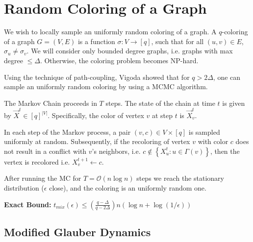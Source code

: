 \section{Random Coloring of a Graph}%
\label{sec:random_coloring_of_a_graph}

We wish to locally sample an uniformly random coloring of a graph.
A $q$-coloring of a graph $G = (V, E)$ is a function $\sigma : V\rightarrow [q]$,
such that for all $(u,v)\in E$, $\sigma_u \not= \sigma_v$.
We will consider only bounded degree graphs, i.e. graphs with max degree $\le \Delta$.
Otherwise, the coloring problem becomes NP-hard.

Using the technique of path-coupling, Vigoda  showed that for $q > 2\Delta$,
one can sample an uniformly random coloring by using a MCMC algorithm.

The Markov Chain proceeds in $T$ steps. The state of the chain at time $t$ is given by $\vec X^t\in [q]^{|V|}$.
Specifically, the color of vertex $v$ at step $t$ is $\vec X^t_v$.

In each step of the Markov process, a pair $(v, c)\in V\times [q]$ is sampled uniformly at random.
Subsequently, if the recoloring of vertex $v$ with color $c$ does not result in a conflict with $v$'s neighbors,
i.e. $c\not\in \left\{ X^t_u : u\in \Gamma(v)\right\}$, then the vertex is recolored i.e. $X_v^{t+1}\leftarrow c$.

After running the MC for $T = \mathcal{O}(n\log n)$ steps we reach the stationary distribution ($\epsilon$ close),
and the coloring is an uniformly random one.

\textbf{Exact Bound:}
$t_{mix}(\epsilon) \le \left( \frac{q-\Delta}{q-2\Delta}\right)n\left( \log n + \log(1/\epsilon)\right)$



\subsection{Modified Glauber Dynamics}%
\label{sub:modified_glauber_dynamics}

